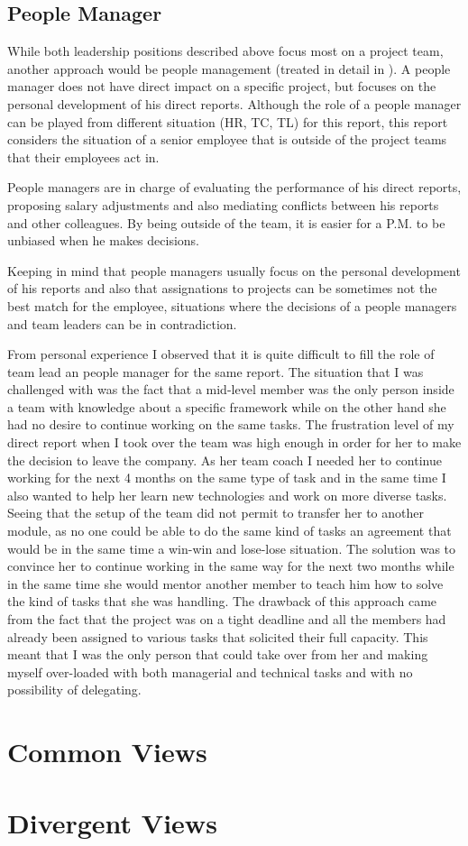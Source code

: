 \subsection{People Manager}
\label{sub-sec:pm}
While both leadership positions described above focus most on a project team, another approach would be people management (treated in detail in \cite{abur-pm}). A people manager does not have direct impact on a specific project, but focuses on the personal development of his direct reports. Although the role of a people manager can be played from different situation (HR, TC, TL) for this report, this report considers the situation of a senior employee that is outside of the project teams that their employees act in. 

People managers are in charge of evaluating the performance of his direct reports, proposing salary adjustments and also mediating conflicts between his reports and other colleagues. By being outside of the team, it is easier for a P.M. to be unbiased when he makes decisions.

Keeping in mind that people managers usually focus on the personal development of his reports and also that assignations to projects can be sometimes not the best match for the employee, situations where the decisions of a people managers and team leaders can be in contradiction. 

From personal experience I observed that it is quite difficult to fill the role of team lead an people manager for the same report. The situation that I was challenged with was the fact that a mid-level member was the only person inside a team with knowledge about a specific framework while on the other hand she had no desire to continue working on the same tasks. The frustration level of my direct report when I took over the team was high enough in order for her to make the decision to leave the company. As her team coach I needed her to continue working for the next 4 months on the same type of task and in the same time I also wanted to help her learn new technologies and work on more diverse tasks. Seeing that the setup of the team did not permit to transfer her to another module, as no one could be able to do the same kind of tasks an agreement that would be in the same time a win-win and lose-lose situation. The solution was to convince her to continue working in the same way for the next two months while in the same time she would mentor another member to teach him how to solve the kind of tasks that she was handling. The drawback of this approach came from the fact that the project was on a tight deadline and all the members had already been assigned to various tasks that solicited their full capacity. This meant that I was the only person that could take over from her and making myself over-loaded with both managerial and technical tasks and with no possibility of delegating.

\section{Common Views}
\label{sec:common}
\section{Divergent Views}
\label{sec:divergent}


